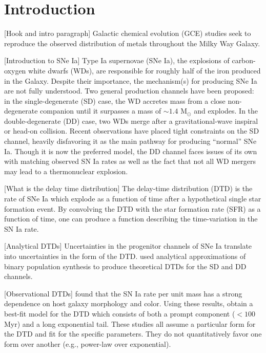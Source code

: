 \documentclass[twocolumn,twocolappendix,linenumbers]{aastex631}
\begin{document}
\section{Introduction}

[Hook and intro paragraph]
Galactic chemical evolution (GCE) studies seek to reproduce the observed distribution of metals throughout the Milky Way Galaxy.

[Introduction to SNe Ia]
Type Ia supernovae (SNe Ia), the explosions of carbon-oxygen white dwarfs (WDs), are responsible for roughly half of the iron produced in the Galaxy. Despite their importance, the mechanism(s) for producing SNe Ia are not fully understood. Two general production channels have been proposed: in the single-degenerate (SD) case, the WD accretes mass from a close non-degenerate companion until it surpasses a mass of $\sim1.4$ M$_\odot$ and explodes. In the double-degenerate (DD) case, two WDs merge after a gravitational-wave inspiral or head-on collision. Recent observations have placed tight constraints on the SD channel, heavily disfavoring it as the main pathway for producing ``normal'' SNe Ia. Though it is now the preferred model, the DD channel faces issues of its own with matching observed SN Ia rates as well as the fact that not all WD mergers may lead to a thermonuclear explosion.

[What is the delay time distribution]
The delay-time distribution (DTD) is the rate of SNe Ia which explode as a function of time after a hypothetical single star formation event. By convolving the DTD with the star formation rate (SFR) as a function of time, one can produce a function describing the time-variation in the SN Ia rate.

[Analytical DTDs]
Uncertainties in the progenitor channels of SNe Ia translate into uncertainties in the form of the DTD. 
\citet{Greggio2005-AnalyticalRates} used analytical approximations of binary population synthesis to produce theoretical DTDs for the SD and DD channels.

[Observational DTDs]
\citet{Mannucci2005-SNRate} found that the SN Ia rate per unit mass has a strong dependence on host galaxy morphology and color. Using these results, \citet{Mannucci2006-TwoPopulations} obtain a best-fit model for the DTD which consists of both a prompt component ($<100$ Myr) and a long exponential tail. These studies all assume a particular form for the DTD and fit for the specific parameters. They do not quantitatively favor one form over another (e.g., power-law over exponential).
\end{document}
